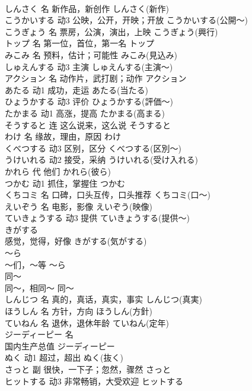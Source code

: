 \documentclass[8pt]{extreport}
\begin{document}
\begin{CJK}{UTF8}{min}
\\	しんさく	名	新作品，新创作	しんさく(新作)	
\\	こうかいする	动3	公映，公开，开映；开放	こうかいする(公開～)	
\\	こうぎょう	名	票房，公演，演出，上映	こうぎょう(興行)	
\\	トップ	名	第一位，首位，第一名	トップ	
\\	みこみ	名	预料，估计；可能性	みこみ(見込み)	
\\	しゅえんする	动3	主演	しゅえんする(主演～)	
\\	アクション	名	动作片，武打剧；动作	アクション	
\\	あたる	动1	成功，走运	あたる(当たる)	
\\	ひょうかする	动3	评价	ひょうかする(評価～)	
\\	たかまる	动1	高涨，提高	たかまる(高まる)	
\\	そうすると	连	这么说来，这么说	そうすると	
\\	わけ	名	缘故，理由，原因	わけ	
\\	くべつする	动3	区别，区分	くべつする(区別～)	
\\	うけいれる	动2	接受，采纳	うけいれる(受け入れる)	
\\	かれら	代	他们	かれら(彼ら)	
\\	つかむ	动1	抓住，掌握住	つかむ	
\\	くちコミ	名	口碑，口头互传，口头推荐	くちコミ(口～)	
\\	えいぞう	名	电影，影像	えいぞう(映像)	
\\	ていきょうする	动3	提供	ていきょうする(提供～)	
\\	きがする	
\\	感觉，觉得，好像	きがする(気がする)	
\\	～ら	
\\	～们，～等	～ら	
\\	同～	
\\	同～，相同～	同～	
\\	しんじつ	名	真的，真话，真实，事实	しんじつ(真実)	
\\	ほうしん	名	方针，方向	ほうしん(方針)	
\\	ていねん	名	退休，退休年龄	ていねん(定年)	
\\	ジーディーピー	名	
\\	国内生产总值	ジーディーピー
\\	ぬく	动1	超过，超出	ぬく(抜く)	
\\	さっと	副	很快，一下子；忽然，骤然	さっと	
\\	ヒットする	动3	非常畅销，大受欢迎	ヒットする	

\end{CJK}
\end{document}

